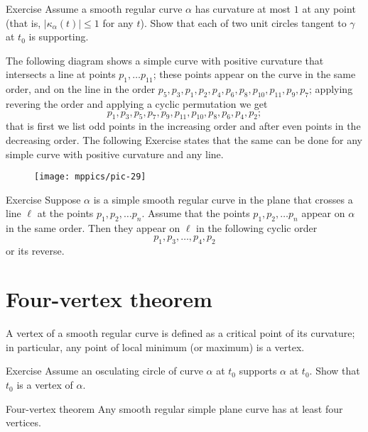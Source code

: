 \begin{thm}{Exercise} Assume a smooth regular curve $\alpha$ has curvature at most $1$ at any point (that is, $|\kappa_\alpha(t)|\le 1$ for any $t$).
Show that each of two unit circles tangent to $\gamma$ at $t_0$ is supporting. 
\end{thm}

The following diagram shows a simple curve with positive curvature that intersects a line at points $p_1,\dots p_11$; these points appear on the curve in the same order, and on the line  in the order $p_5,p_3,p_1,p_2,p_4,p_6,p_8,p_{10},p_{11},p_9,p_7$;
applying revering the order and applying a cyclic permutation we get
\[p_1,p_3,p_5,p_7,p_9,p_{11},p_{10},p_8,p_6,p_4,p_2;\]
that is first we list odd points in the increasing order and after even points in the decreasing order.
The following Exercise states that the same can be done for any simple curve with positive curvature and any line.

\begin{figure}[h!]
\vskip-0mm
\centering
\texttt{[image: mppics/pic-29]}
\vskip0mm
\end{figure}

\begin{thm}{Exercise}
Suppose $\alpha$ is a simple smooth regular curve in the plane that crosses a line $\ell$ at the points $p_1,p_2,\dots p_n$.
Assume that the points $p_1,p_2,\dots p_n$ appear on $\alpha$ in the same order.
Then they appear on $\ell$ in the following cyclic order 
\[p_1,p_3,\dots,p_4 ,p_2\]
or its reverse.
\end{thm}


\section{Four-vertex theorem}



A vertex of a smooth regular curve is defined as a critical point of its curvature;
in particular, any point of local minimum (or maximum) is a vertex.

\begin{thm}{Exercise}
Assume an osculating circle of curve $\alpha$ at $t_0$ supports $\alpha$ at $t_0$.
Show that $t_0$ is a vertex of $\alpha$.
\end{thm}

\begin{thm}{Four-vertex theorem}
Any smooth regular simple plane curve has at least four
vertices.
\end{thm}

